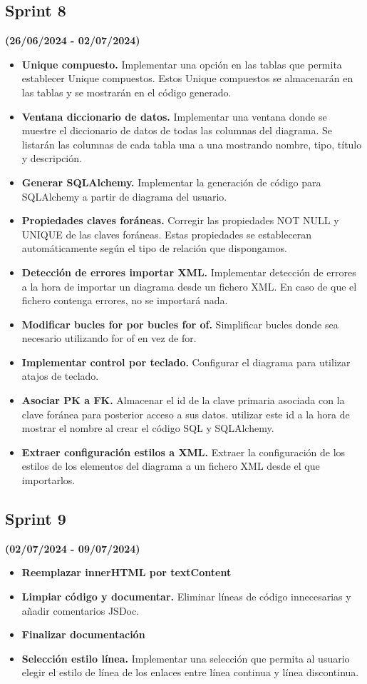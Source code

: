 \subsection{Sprint 8}
\textbf{(26/06/2024 - 02/07/2024)}
\begin{itemize}
    \item \textbf{Unique compuesto.} Implementar una opción en las tablas que permita establecer Unique compuestos. Estos Unique compuestos se almacenarán en las tablas y se mostrarán en el código generado.
    \item \textbf{Ventana diccionario de datos.} Implementar una ventana donde se muestre el diccionario de datos de todas las columnas del diagrama. Se listarán las columnas de cada tabla una a una mostrando nombre, tipo, título y descripción.
    \item \textbf{Generar SQLAlchemy.} Implementar la generación de código para SQLAlchemy a partir de diagrama del usuario.
    \item \textbf{Propiedades claves foráneas.} Corregir las propiedades NOT NULL y UNIQUE de las claves foráneas. Estas propiedades se estableceran automáticamente según el tipo de relación que dispongamos.
    \item \textbf{Detección de errores importar XML.} Implementar detección de errores a la hora de importar un diagrama desde un fichero XML. En caso de que el fichero contenga errores, no se importará nada.
    \item \textbf{Modificar bucles for por bucles for of.} Simplificar bucles donde sea necesario utilizando for of en vez de for.
    \item \textbf{Implementar control por teclado. }Configurar el diagrama para utilizar atajos de teclado.
    \item \textbf{Asociar PK a FK. }Almacenar el id de la clave primaria asociada con la clave foránea para posterior acceso a sus datos. utilizar este id a la hora de mostrar el nombre al crear el código SQL y SQLAlchemy.
    \item \textbf{Extraer configuración estilos a XML. }Extraer la configuración de los estilos de los elementos del diagrama a un fichero XML desde el que importarlos.
\end{itemize}

\subsection{Sprint 9}
\textbf{(02/07/2024 - 09/07/2024)}
\begin{itemize}
    \item \textbf{Reemplazar innerHTML por textContent}
    \item \textbf{Limpiar código y documentar. }Eliminar líneas de código innecesarias y añadir comentarios JSDoc.
    \item \textbf{Finalizar documentación}
    \item \textbf{Selección estilo línea. }Implementar una selección que permita al usuario elegir el estilo de línea de los enlaces entre línea continua y línea discontinua.
\end{itemize}

